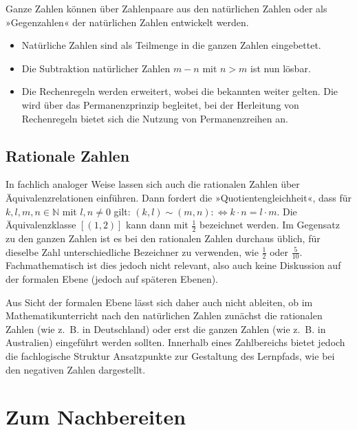 \documentclass[
]{scrbook}
\providecommand{\tightlist}{%
  \setlength{\itemsep}{0pt}\setlength{\parskip}{0pt}}
\theoremstyle{definition}
\theoremstyle{definition}
\theoremstyle{definition}
\theoremstyle{definition}
\theoremstyle{remark}
\begin{document}
\textcolor{formalColor}{Ganze Zahlen können über Zahlenpaare aus den natürlichen Zahlen oder als »Gegenzahlen« der natürlichen Zahlen entwickelt werden.}

\begin{itemize}
\tightlist
\item
  \textcolor{formalColor}{Natürliche Zahlen sind als Teilmenge in die ganzen Zahlen eingebettet.}
\item
  \textcolor{formalColor}{Die Subtraktion natürlicher Zahlen $m-n$ mit $n > m$ ist nun lösbar.}
\item
  \textcolor{formalColor}{Die Rechenregeln werden erweitert, wobei die bekannten weiter gelten. Die wird über das Permanenzprinzip begleitet, bei der Herleitung von Rechenregeln bietet sich die Nutzung von Permanenzreihen an.}
\end{itemize}

\subsection{Rationale Zahlen}\label{rationale-zahlen}

In fachlich analoger Weise lassen sich auch die rationalen Zahlen über Äquivalenzrelationen einführen. Dann fordert die »Quotientengleichheit«, dass für \(k,l,m,n\in\mathbb{N}\) mit \(l,n\neq 0\) gilt: \((k,l)\sim (m,n):\Leftrightarrow k\cdot n=l\cdot m\). Die Äquivalenzklasse \([(1,2)]\) kann dann mit \(\frac{1}{2}\) bezeichnet werden. Im Gegensatz zu den ganzen Zahlen ist es bei den rationalen Zahlen durchaus üblich, für dieselbe Zahl unterschiedliche Bezeichner zu verwenden, wie \(\frac{1}{2}\) oder \(\frac{5}{10}\). Fachmathematisch ist dies jedoch nicht relevant, also auch keine Diskussion auf der formalen Ebene (jedoch auf späteren Ebenen).

Aus Sicht der formalen Ebene lässt sich daher auch nicht ableiten, ob im Mathematikunterricht nach den natürlichen Zahlen zunächst die rationalen Zahlen (wie z.~B. in Deutschland) oder erst die ganzen Zahlen (wie z.~B. in Australien) eingeführt werden sollten. Innerhalb eines Zahlbereichs bietet jedoch die fachlogische Struktur Ansatzpunkte zur Gestaltung des Lernpfads, wie bei den negativen Zahlen dargestellt.

\section{Zum Nachbereiten}\label{mathematik-strukturieren-nachbereitung}
\end{document}
